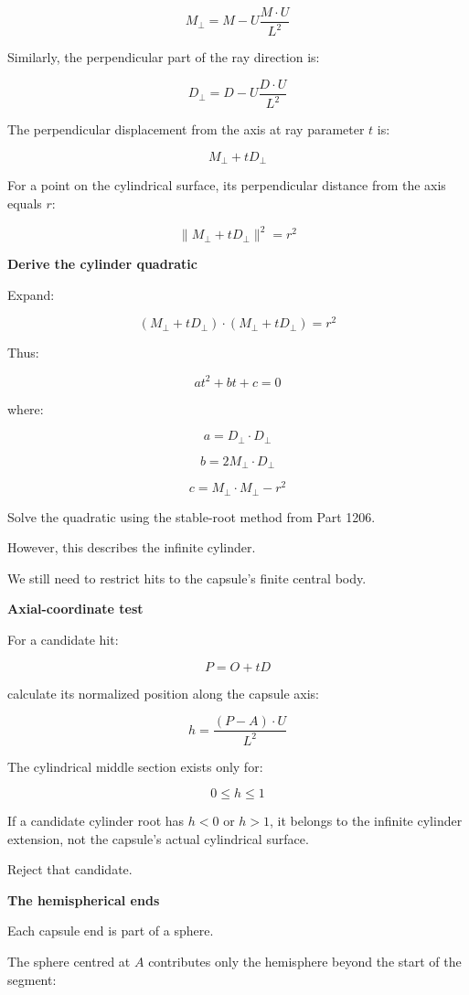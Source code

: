 \[
\boxed{ M_\perp= M-U\frac{M\cdot U}{L^2} }
\]

Similarly, the perpendicular part of the ray direction is:

\[
\boxed{ D_\perp= D-U\frac{D\cdot U}{L^2} }
\]

The perpendicular displacement from the axis at ray parameter \(t\) is:

\[
M_\perp+tD_\perp
\]

For a point on the cylindrical surface, its perpendicular distance from the axis equals \(r\):

\[
\|M_\perp+tD_\perp\|^2=r^2
\]

\textbf{Derive the cylinder quadratic}

Expand:

\[
(M_\perp+tD_\perp)\cdot (M_\perp+tD_\perp)=r^2
\]

Thus:

\[
\boxed{ at^2+bt+c=0 }
\]

where:

\[
\boxed{ a=D_\perp\cdot D_\perp }
\]

\[
\boxed{ b=2M_\perp\cdot D_\perp }
\]

\[
\boxed{ c=M_\perp\cdot M_\perp-r^2 }
\]

Solve the quadratic using the stable-root method from Part 1206.

However, this describes the infinite cylinder.

We still need to restrict hits to the capsule's finite central body.

\textbf{Axial-coordinate test}

For a candidate hit:

\[
P=O+tD
\]

calculate its normalized position along the capsule axis:

\[
\boxed{ h=\frac{(P-A)\cdot U}{L^2} }
\]

The cylindrical middle section exists only for:

\[
\boxed{ 0\le h\le1 }
\]

If a candidate cylinder root has \(h<0\) or \(h>1\), it belongs to the infinite cylinder extension, not the capsule's actual cylindrical surface.

Reject that candidate.

\textbf{The hemispherical ends}

Each capsule end is part of a sphere.

The sphere centred at \(A\) contributes only the hemisphere beyond the start of the segment:

